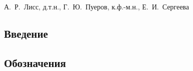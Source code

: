 \documentclass[14pt]{article}
\begin{document}
%
\noindent А.~Р.~Лисс, д.т.н., Г.~Ю.~Пуеров, к.ф.-м.н.,  Е.~И.~Сергеева
%
%
%
\bigskip



\bigskip

\subsection*{Введение}


\subsection*{Обозначения}












%

\begin{comment}
\subsection*{Заключение}


В статье предложена схема вычислений для алгоритмов восстановления данных
без сглаживания и со сглаживанием, которая позволяет сократить
количество арифметических операций, требуемых для их выполнения.
На базе этой схемы построены эффективные параллельные алгоритмы
для класса вычислительных систем, описываемых моделью БСКП.
Произведена теоретическая оценка вычислительной и коммуникационной сложности
предложенных алгоритмов,
выведены зависимости между размерностями задачи и параметрами модели БСКП.


\end{comment}

% 
% 

\printbibliography


\end{document}
